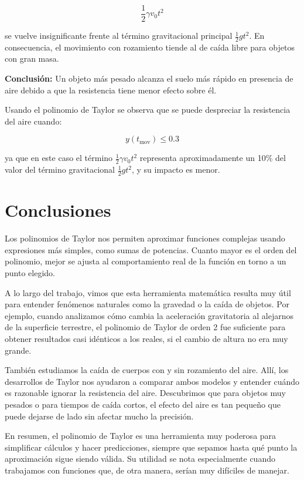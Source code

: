\documentclass{article}
\begin{document}
\[
\frac{1}{2} \gamma v_0 t^2
\]

se vuelve insignificante frente al término gravitacional principal $\frac{1}{2}gt^2$. En consecuencia, el movimiento con rozamiento tiende al de caída libre para objetos con gran masa.

\medskip

\textbf{Conclusión:} Un objeto más pesado alcanza el suelo más rápido en presencia de aire debido a que la resistencia tiene menor efecto sobre él.

\medskip

Usando el polinomio de Taylor se observa que se puede despreciar la resistencia del aire cuando:

\[
y(t_{\text{mov}}) \leq 0.3
\]

ya que en este caso el término $\frac{1}{2}\gamma v_0 t^2$ representa aproximadamente un 10\% del valor del término gravitacional $\frac{1}{2}gt^2$, y su impacto es menor.





\section{Conclusiones}

Los polinomios de Taylor nos permiten aproximar funciones complejas usando expresiones más simples, como sumas de potencias. Cuanto mayor es el orden del polinomio, mejor se ajusta al comportamiento real de la función en torno a un punto elegido.

A lo largo del trabajo, vimos que esta herramienta matemática resulta muy útil para entender fenómenos naturales como la gravedad o la caída de objetos. Por ejemplo, cuando analizamos cómo cambia la aceleración gravitatoria al alejarnos de la superficie terrestre, el polinomio de Taylor de orden 2 fue suficiente para obtener resultados casi idénticos a los reales, si el cambio de altura no era muy grande.

También estudiamos la caída de cuerpos con y sin rozamiento del aire. Allí, los desarrollos de Taylor nos ayudaron a comparar ambos modelos y entender cuándo es razonable ignorar la resistencia del aire. Descubrimos que para objetos muy pesados o para tiempos de caída cortos, el efecto del aire es tan pequeño que puede dejarse de lado sin afectar mucho la precisión.

En resumen, el polinomio de Taylor es una herramienta muy poderosa para simplificar cálculos y hacer predicciones, siempre que sepamos hasta qué punto la aproximación sigue siendo válida. Su utilidad se nota especialmente cuando trabajamos con funciones que, de otra manera, serían muy difíciles de manejar.
\end{document}

